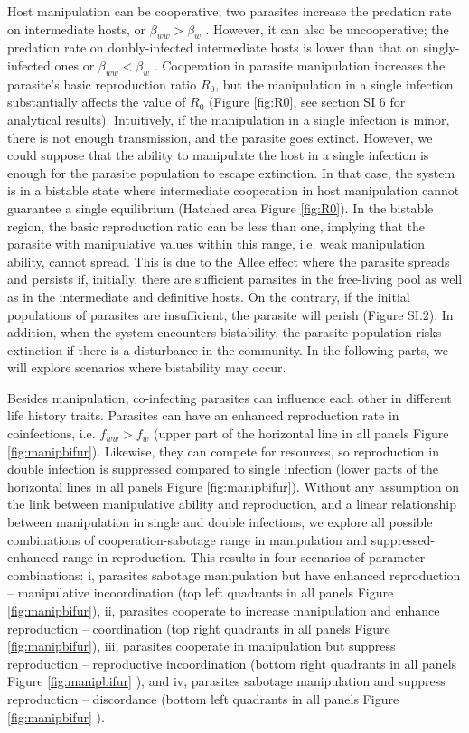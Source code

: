 \documentclass[a4paper]{scrartcl}
\begin{document}
Host manipulation can be cooperative; two parasites increase the predation rate on intermediate hosts, or $\beta_{ww} > \beta_w$ \citep{Hafer:2015gl}. 
However, it can also be uncooperative; the predation rate on doubly-infected intermediate hosts is lower than that on singly-infected ones or $\beta_{ww} < \beta_w$ \citep{Hafer:2015gl}.
Cooperation in parasite manipulation increases the parasite's basic reproduction ratio $R_0$, but the manipulation in a single infection substantially affects the value of $R_0$ (Figure \ref{fig:R0}, see section SI 6 for analytical results). 
Intuitively, if the manipulation in a single infection is minor, there is not enough transmission, and the parasite goes extinct.
However, we could suppose that the ability to manipulate the host in a single infection is enough for the parasite population to escape extinction. 
In that case, the system is in a bistable state where intermediate cooperation in host manipulation cannot guarantee a single equilibrium (Hatched area Figure \ref{fig:R0}). 
In the bistable region, the basic reproduction ratio can be less than one, implying that the parasite with manipulative values within this range, i.e. weak manipulation ability, cannot spread.
This is due to the Allee effect where the parasite spreads and persists if, initially, there are sufficient parasites in the free-living pool as well as in the intermediate and definitive hosts.
On the contrary, if the initial populations of parasites are insufficient, the parasite will perish (Figure SI.2).
In addition, when the system encounters bistability, the parasite population risks extinction if there is a disturbance in the community.
In the following parts, we will explore scenarios where bistability may occur. 

Besides manipulation, co-infecting parasites can influence each other in different life history traits.
Parasites can have an enhanced reproduction rate in coinfections, i.e. $f_{ww} > f_w$ (upper part of the horizontal line in all panels Figure \ref{fig:manipbifur}). 
Likewise, they can compete for resources, so reproduction in double infection is suppressed compared to single infection (lower parts of the horizontal lines in all panels Figure \ref{fig:manipbifur}). 
Without any assumption on the link between manipulative ability and reproduction, and a linear relationship between manipulation in single and double infections, we explore all possible combinations of cooperation-sabotage range in manipulation and suppressed-enhanced range in reproduction. This results in four scenarios of parameter combinations: i, parasites sabotage manipulation but have enhanced reproduction -- manipulative incoordination (top left quadrants in all panels Figure \ref{fig:manipbifur}), ii, parasites cooperate to increase manipulation and enhance reproduction -- coordination (top right quadrants in all panels Figure \ref{fig:manipbifur}), iii, parasites cooperate in manipulation but suppress reproduction -- reproductive incoordination (bottom right quadrants in all panels Figure \ref{fig:manipbifur} ), and iv, parasites sabotage manipulation and suppress reproduction -- discordance (bottom left quadrants in all panels Figure \ref{fig:manipbifur} ).
\end{document}
